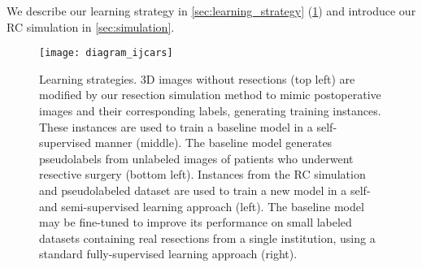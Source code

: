 We describe our learning strategy in \cref{sec:learning_strategy} (\cref{fig:diagram_ijcars})
and introduce our \ac{RC} simulation in \cref{sec:simulation}.

\begin{figure}[ht]
  \centering
  \texttt{[image: diagram\_ijcars]}
  \caption[Learning strategies for cavity segmentation]{
    Learning strategies.
    3D images without resections (top left) are modified by our resection simulation method to mimic postoperative images and their corresponding labels, generating training instances.
    These instances are used to train a baseline model in a self-supervised manner (middle).
    The baseline model generates pseudolabels from unlabeled images of patients who underwent resective surgery (bottom left).
    Instances from the \ac{RC} simulation and pseudolabeled dataset are used to train a new model in a self- and semi-supervised learning approach (left).
    The baseline model may be fine-tuned to improve its performance on small labeled datasets containing real resections from a single institution, using a standard fully-supervised learning approach (right).
  }
  \label{fig:diagram_ijcars}
\end{figure}
